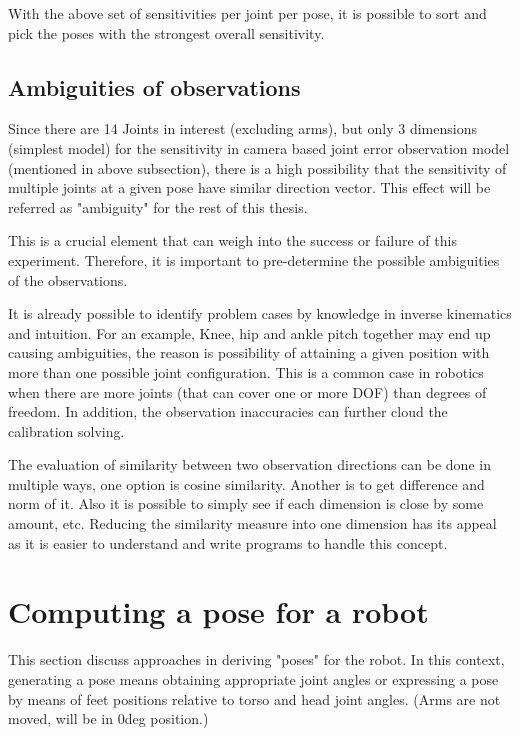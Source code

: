 \documentclass[english, printversion, nomenclature, notitle]{tuvisionthesis} %
\begin{document}
With the above set of sensitivities per joint per pose, it is possible to sort and pick the poses with the strongest overall sensitivity.

\subsection{Ambiguities of observations}
\label{subsec:ambiguities}

Since there are 14 Joints in interest (excluding arms), but only 3 dimensions (simplest model) for the sensitivity in camera based joint error observation model (mentioned in above subsection), there is a high possibility that the sensitivity of multiple joints at a given pose have similar direction vector. This effect will be referred as "ambiguity" for the rest of this thesis.
 
This is a crucial element that can weigh into the success or failure of this experiment. Therefore, it is important to pre-determine the possible ambiguities of the observations. 

It is already possible to identify problem cases by knowledge in inverse kinematics and intuition. For an example, Knee, hip and ankle pitch together may end up causing ambiguities, the reason is possibility of attaining a given position with more than one possible joint configuration. This is a common case in robotics when there are more joints (that can cover one or more DOF) than degrees of freedom. In addition, the observation inaccuracies can further cloud the calibration solving.

The evaluation of similarity between two observation directions can be done in multiple ways, one option is cosine similarity. Another is to get difference and norm of it. Also it is possible to simply see if each dimension is close by some amount, etc. Reducing the similarity measure into one dimension has its appeal as it is easier to understand and write programs to handle this concept.


\section{Computing a pose for a robot}
This section discuss approaches in deriving "poses" for the robot. In this context, generating a pose means obtaining appropriate joint angles or expressing a pose by means of feet positions relative to torso and head joint angles. (Arms are not moved, will be in 0deg position.)
\end{document}
